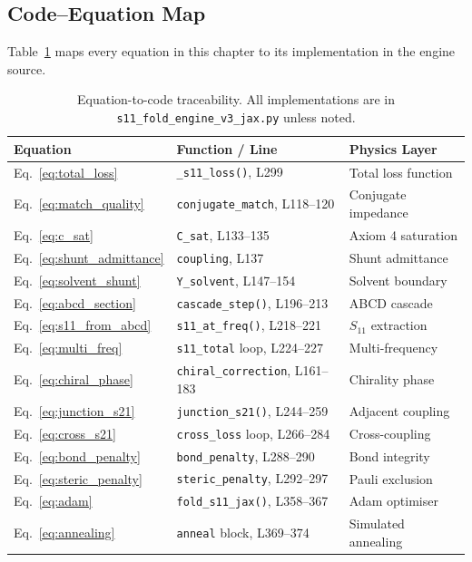 \subsection{Code--Equation Map}

Table~\ref{tab:code_equation_map} maps every equation in this chapter to its implementation in the engine source.

\begin{table}[H]
\centering
\caption{Equation-to-code traceability.  All implementations are in \texttt{s11\_fold\_engine\_v3\_jax.py} unless noted.}
\label{tab:code_equation_map}
\small
\begin{tabular}{@{}l l l@{}}
\toprule
\textbf{Equation} & \textbf{Function / Line} & \textbf{Physics Layer} \\
\midrule
Eq.~\ref{eq:total_loss}           & \texttt{\_s11\_loss()}, L299            & Total loss function \\
Eq.~\ref{eq:match_quality}        & \texttt{conjugate\_match}, L118--120    & Conjugate impedance \\
Eq.~\ref{eq:c_sat}                & \texttt{C\_sat}, L133--135              & Axiom 4 saturation \\
Eq.~\ref{eq:shunt_admittance}     & \texttt{coupling}, L137                 & Shunt admittance \\
Eq.~\ref{eq:solvent_shunt}        & \texttt{Y\_solvent}, L147--154          & Solvent boundary \\
Eq.~\ref{eq:abcd_section}         & \texttt{cascade\_step()}, L196--213     & ABCD cascade \\
Eq.~\ref{eq:s11_from_abcd}        & \texttt{s11\_at\_freq()}, L218--221     & $S_{11}$ extraction \\
Eq.~\ref{eq:multi_freq}           & \texttt{s11\_total} loop, L224--227     & Multi-frequency \\
Eq.~\ref{eq:chiral_phase}         & \texttt{chiral\_correction}, L161--183  & Chirality phase \\
Eq.~\ref{eq:junction_s21}         & \texttt{junction\_s21()}, L244--259     & Adjacent coupling \\
Eq.~\ref{eq:cross_s21}            & \texttt{cross\_loss} loop, L266--284    & Cross-coupling \\
Eq.~\ref{eq:bond_penalty}         & \texttt{bond\_penalty}, L288--290       & Bond integrity \\
Eq.~\ref{eq:steric_penalty}       & \texttt{steric\_penalty}, L292--297     & Pauli exclusion \\
Eq.~\ref{eq:adam}                  & \texttt{fold\_s11\_jax()}, L358--367    & Adam optimiser \\
Eq.~\ref{eq:annealing}            & \texttt{anneal} block, L369--374        & Simulated annealing \\
\bottomrule
\end{tabular}
\end{table}


